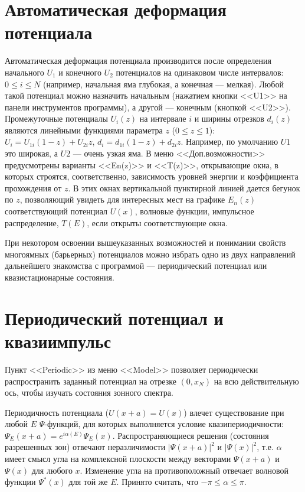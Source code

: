\documentclass[12pt]{article}
\begin{document}
\hypertarget{Uz}{}\section{Автоматическая деформация потенциала}
Автоматическая деформация потенциала производится после определения начального $U_1$ и конечного $U_2$ потенциалов
на одинаковом числе интервалов: $0\le i\le N$ (например, начальная яма глубокая, а конечная --- мелкая).
Любой такой потенциал можно назначить начальным (нажатием кнопки <<U1>> на панели инструментов программы), а другой ---
конечным (кнопкой <<U2>>). Промежуточные потенциалы $U_i(z)$ на интервале $i$  и ширины отрезков $d_i(z)$ являются линейными
функциями параметра $z$ ($0\le z\le 1$): $U_i=U_{1i} (1-z)+U_{2i}z$, $d_i=d_{1i} (1-z)+d_{2i}z$. Например,
по умолчанию $U1$ это широкая, а $U2$ --- очень узкая яма. В меню <<Доп.возможности>> предусмотрены варианты <<En(z)>>
и <<T(z)>>, открывающие окна, в которых строятся, соответственно, зависимость уровней энергии и коэффициента прохождения
от $z$. В этих окнах вертикальной пунктирной линией дается бегунок по $z$, позволяющий увидеть для интересных мест на
графике $E_n(z)$ соответствующий потенциал $U(x)$, волновые функции, импульсное распределение, $T(E)$, если открыты
соответствующие окна.

При некотором %
освоении вышеуказанных возможностей и понимании свойств многоямных (барьерных) потенциалов можно
избрать одно из двух направлений дальнейшего знакомства с программой --- периодический потенциал или
квазистационарные состояния.

\hypertarget{Uper}{}\section[Периодический потенциал и квазиимпульс]{Периодический потенциал и квазиимпульс}
Пункт <<Periodic>> из меню <<Model>> позволяет периодически распространить заданный потенциал на отрезке $(0,x_N)$
на всю действительную ось, чтобы изучать состояния зонного спектра.

Периодичность потенциала ($U(x+a)=U(x)$) влечет существование при
любой $E$ $\Psi$-функций, для которых выполняется условие
квазипериодичности: $\Psi_E(x+a)=e^{i\alpha(E)}\Psi_E(x)$.
Распространяющиеся решения (состояния разрешенных зон) отвечают
неразличимости $|\Psi(x+a)|^2$ и $|\Psi(x)|^2$, т.е. $\alpha$ имеет смысл угла
на комплексной плоскости между векторами $\Psi(x+a)$ и $\Psi(x)$ для любого $x$. Изменение угла на противоположный отвечает волновой функции $\Psi^*(x)$ для той же $E$.
Принято считать, что  $-\pi\le\alpha\le\pi$.
\end{document}
